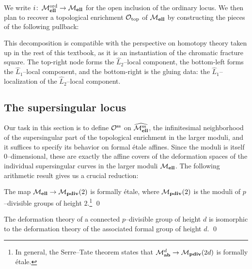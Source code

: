 \noindent We write \(i\colon\thinspace \mathcal{M}_{\mathbf{ell}}^{\mathrm{ord}} \to \mathcal{M}_{\mathbf{ell}}\) for the open inclusion of the ordinary locus.  We then plan to recover a topological enrichment $\mathcal{O}_{\mathrm{top}}$ of $\mathcal{M}_{\mathbf{ell}}$ by constructing the pieces of the following pullback:
\begin{center}
\end{center}
This decomposition is compatible with the perspective on homotopy theory taken up in the rest of this textbook, as it is an instantiation of the chromatic fracture square.  The top-right node forms the \(\widehat L_2\)--local component, the bottom-left forms the \(\widehat L_1\)--local component, and the bottom-right is the gluing data: the \(\widehat L_1\)--localization of the \(\widehat L_2\)--local component.






\subsection*{The supersingular locus}

Our task in this section is to define \(\mathcal{O}^{\mathrm{ss}}\) on \(\widehat{\mathcal{M}_{\mathbf{ell}}^{\mathrm{ss}}}\), the infinitesimal neighborhood of the supersingular part of the topological enrichment in the larger moduli, and it suffices to specify its behavior on formal \'etale affines.  Since the moduli is itself \(0\)--dimensional, these are exactly the affine covers of the deformation spaces of the individual supersingular curves in the larger moduli \(\mathcal{M}_{\mathbf{ell}}\).  The following arithmetic result gives us a crucial reduction:

\begin{theorem}
The map \(\mathcal{M}_{\mathbf{ell}} \to \mathcal{M}_{\mathbf{pdiv}}(2)\) is formally \'etale, where \(\mathcal{M}_{\mathbf{pdiv}}(2)\) is the moduli of \(p\)--divisible groups of height \(2\).\footnote{In general, the Serre--Tate theorem states that \(\mathcal{M}_{\mathbf{ab}}^{d} \to \mathcal{M}_{\mathbf{pdiv}}(2d)\) is formally \'etale.} \qed
\end{theorem}
\begin{lemma}
The deformation theory of a connected \(p\)--divisible group of height \(d\) is isomorphic to the deformation theory of the associated formal group of height \(d\). \qed
\end{lemma}

